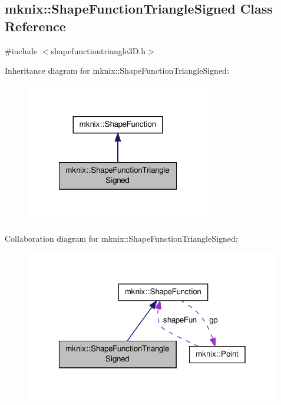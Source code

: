 \hypertarget{classmknix_1_1_shape_function_triangle_signed}{\subsection{mknix\-:\-:Shape\-Function\-Triangle\-Signed Class Reference}
\label{classmknix_1_1_shape_function_triangle_signed}
}


{\ttfamily \#include $<$shapefunctiontriangle3\-D.\-h$>$}



Inheritance diagram for mknix\-:\-:Shape\-Function\-Triangle\-Signed\-:\nopagebreak
\begin{figure}[H]
\begin{center}
\leavevmode
\includegraphics[width=228pt]{da/da5/classmknix_1_1_shape_function_triangle_signed__inherit__graph}
\end{center}
\end{figure}


Collaboration diagram for mknix\-:\-:Shape\-Function\-Triangle\-Signed\-:\nopagebreak
\begin{figure}[H]
\begin{center}
\leavevmode
\includegraphics[width=316pt]{dc/d0d/classmknix_1_1_shape_function_triangle_signed__coll__graph}
\end{center}
\end{figure}
